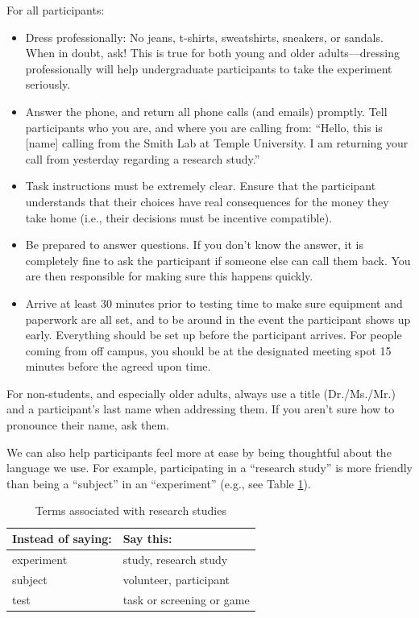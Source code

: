 \documentclass[letterpaper,11pt,oneside]{memoir}
\begin{document}
For all participants:

\begin{itemize}
\item Dress professionally: No jeans, t-shirts, sweatshirts, sneakers, or sandals. When in doubt, ask! This is true for both young and older adults---dressing professionally will help undergraduate participants to take the experiment seriously.
\item Answer the phone, and return all phone calls (and emails) promptly. Tell participants who you are, and where you are calling from: ``Hello, this is [name] calling from the Smith Lab at Temple University. I am returning your call from yesterday regarding a research study.''
\item Task instructions must be extremely clear. Ensure that the participant understands that their choices have real consequences for the money they take home (i.e., their decisions must be incentive compatible). 
\item Be prepared to answer questions. If you don't know the answer, it is completely fine to ask the participant if someone else can call them back. You are then responsible for making sure this happens quickly.
\item Arrive at least 30 minutes prior to testing time to make sure equipment and paperwork are all set, and to be around in the event the participant shows up early. Everything should be set up before the participant arrives. For people coming from off campus, you should be at the designated meeting spot 15 minutes before the agreed upon time.
\end{itemize}
	
For non-students, and especially older adults, always use a title (Dr./Ms./Mr.) and a participant's last name when addressing them. If you aren't sure how to pronounce their name, ask them.

We can also help participants feel more at ease by being thoughtful about the language we use. For example, participating in a ``research study'' is more friendly than being a ``subject'' in an ``experiment'' (e.g., see Table \ref{table:terms}).

\begin{table}
\centering
\caption{Terms associated with research studies}
\begin{tabular}{ll}
\toprule
Instead of saying: & Say this:\\
\midrule
experiment& study, research study\\
subject& volunteer, participant\\
test & task or screening or game \\
\bottomrule
\end{tabular}
\label{table:terms}
\end{table}
\end{document}
